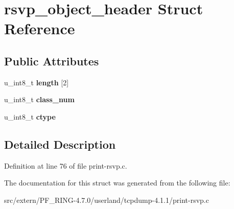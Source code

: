 \hypertarget{structrsvp__object__header}{
\section{rsvp\_\-object\_\-header Struct Reference}
\label{structrsvp__object__header}
}
\subsection*{Public Attributes}
\begin{DoxyCompactItemize}
\item 
\hypertarget{structrsvp__object__header_ab3c7e44672c22c610578f610cca036b1}{
u\_\-int8\_\-t {\bfseries length} \mbox{[}2\mbox{]}}
\label{structrsvp__object__header_ab3c7e44672c22c610578f610cca036b1}

\item 
\hypertarget{structrsvp__object__header_aad27da904dfb8f66801825301f250c19}{
u\_\-int8\_\-t {\bfseries class\_\-num}}
\label{structrsvp__object__header_aad27da904dfb8f66801825301f250c19}

\item 
\hypertarget{structrsvp__object__header_adf08d708552bf7ad5f5bed46e3509bc9}{
u\_\-int8\_\-t {\bfseries ctype}}
\label{structrsvp__object__header_adf08d708552bf7ad5f5bed46e3509bc9}

\end{DoxyCompactItemize}


\subsection{Detailed Description}


Definition at line 76 of file print-\/rsvp.c.



The documentation for this struct was generated from the following file:\begin{DoxyCompactItemize}
\item 
src/extern/PF\_\-RING-\/4.7.0/userland/tcpdump-\/4.1.1/print-\/rsvp.c\end{DoxyCompactItemize}
